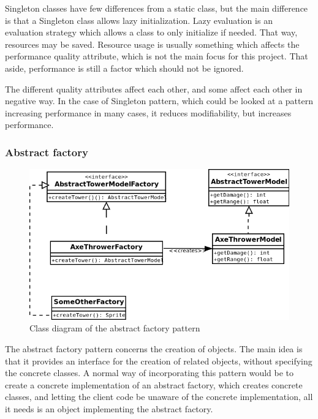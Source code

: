 Singleton classes have few differences from a static class, but the main difference is that a Singleton class allows lazy initialization. Lazy evaluation is an evaluation strategy which allows a class to only initialize if needed. That way, resources may be saved. Resource usage is usually something which affects the performance quality attribute, which is not the main focus for this project. That aside, performance is still a factor which should not be ignored. \cite{wiki:singleton}

The different quality attributes affect each other, and some affect each other in negative way. In the case of Singleton pattern, which could be looked at a pattern increasing performance in many cases, it reduces modifiability, but increases performance.  

\subsubsection{Abstract factory}

\begin{figure}[h]
\includegraphics[width=1\linewidth]{images/abstractFactory.png}
\caption{Class diagram of the abstract factory pattern}
\end{figure}

The abstract factory pattern concerns the creation of objects. The main idea is that it provides an interface for the creation of related objects, without specifying the concrete classes. A normal way of incorporating this pattern would be to create a concrete implementation of an abstract factory, which creates concrete classes, and letting the client code be unaware of the concrete implementation, all it needs is an object implementing the abstract factory. \cite{wiki:abfac}  


